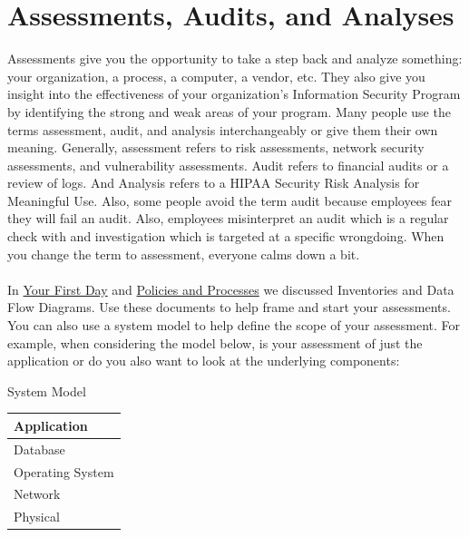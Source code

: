 \section{Assessments, Audits, and Analyses}\label{sec:"Assessments, Audits, and Analyses"}
Assessments give you the opportunity to take a step back and analyze something: your organization, a process, a computer, a vendor, etc. They also give you insight into the effectiveness of your organization's Information Security Program by identifying the strong and weak areas of your program. Many people use the terms assessment, audit, and analysis interchangeably or give them their own meaning. Generally, assessment refers to risk assessments, network security assessments, and vulnerability assessments. Audit refers to financial audits or a review of logs. And Analysis refers to a HIPAA Security Risk Analysis for Meaningful Use. Also, some people avoid the term audit because employees fear they will fail an audit. Also, employees misinterpret an audit which is a regular check with and investigation which is targeted at a specific wrongdoing.  When you change the term to assessment, everyone calms down a bit.\\\\
In \hyperref[sec:"Your First Day"]{Your First Day} and \hyperref[sec:"Policies and Processes"]{Policies and Processes} we discussed Inventories and Data Flow Diagrams. Use these documents to help frame and start your assessments. You can also use a system model to help define the scope of your assessment. For example, when considering the model below, is your assessment of just the application or do you also want to look at the underlying components:\\
\begin{table}[h]\begin{center}System Model\\\begin{tabular}{|l|}\hline\hline
Application\\\hline
Database\\\hline
Operating System\\\hline
Network\\\hline
Physical\\\hline
\end{tabular}\end{center}\end{table}
